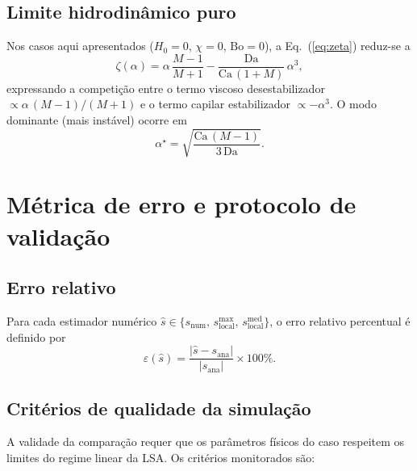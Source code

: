 \documentclass[11pt,a4paper]{article}
\newcommand{\Da}{\mathrm{Da}}
\newcommand{\Ca}{\mathrm{Ca}}
\newcommand{\Bo}{\mathrm{Bo}}
\begin{document}
\subsection{Limite hidrodinâmico puro}

Nos casos aqui apresentados ($H_0 = 0$, $\chi = 0$, $\Bo = 0$), a Eq.\
(\ref{eq:zeta}) reduz-se a
\begin{equation}
    \zeta(\alpha) = \alpha\,\frac{M-1}{M+1} - \frac{\Da}{\Ca\,(1+M)}\,\alpha^3,
\end{equation}
expressando a competição entre o termo viscoso desestabilizador
$\propto\alpha\,(M-1)/(M+1)$ e o termo capilar estabilizador
$\propto -\alpha^3$. O modo dominante (mais instável) ocorre em
\begin{equation}
    \alpha^\star = \sqrt{ \frac{\Ca\,(M-1)}{3\,\Da} }.
\end{equation}

\section{Métrica de erro e protocolo de validação}

\subsection{Erro relativo}

Para cada estimador numérico $\hat{s}\in\{s_{\mathrm{num}},\,
s_{\mathrm{local}}^{\max},\,s_{\mathrm{local}}^{\mathrm{med}}\}$, o erro
relativo percentual é definido por
\begin{equation}
    \varepsilon(\hat{s}) = \frac{\bigl|\hat{s} - s_{\mathrm{ana}}\bigr|}{|s_{\mathrm{ana}}|}\times 100\%.
    \label{eq:erro}
\end{equation}

\subsection{Critérios de qualidade da simulação}

A validade da comparação requer que os parâmetros físicos do caso
respeitem os limites do regime linear da LSA. Os critérios monitorados
são:
\end{document}
